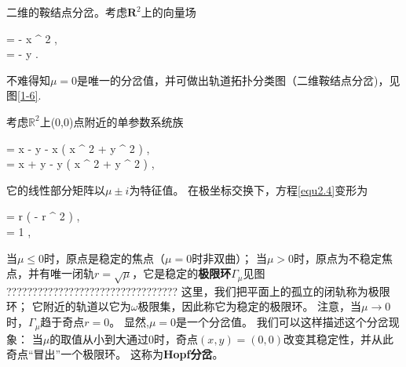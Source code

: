 \begin{example}
  二维的鞍结点分岔。考虑$\mathbf { R } ^ { 2 }$上的向量场
  \begin{ode}
        \dxdt = \mu - x ^ { 2 }  ,\\
        \dydt = - y .
  \end{ode}
  不难得知\(\mu=0\)是唯一的分岔值，并可做出轨道拓扑分类图（二维鞍结点分岔)，见图\ref{1-6}.
\end{example}

\begin{example}
  考虑$\mathbb{ R } ^ { 2 }$上(0,0)点附近的单参数系统族
\begin{ode}
\label{equ2.4}
\dxdt = \mu x - y - x \left( x ^ { 2 } + y ^ { 2 } \right) , \\
\dydt = x + \mu y - y \left( x ^ { 2 } + y ^ { 2 } \right) ,
\end{ode}
它的线性部分矩阵以$\mu \pm i$为特征值。
在极坐标交换下，方程\ref{equ2.4}变形为
\begin{ode}
      \dxdt= r \left( \mu - r ^ { 2 } \right)  ,\\
     \dydt = 1 ,
\end{ode}
当$\mu \leqslant 0$时，原点是稳定的焦点（\(\mu=0\)时非双曲）；
当$\mu > 0$时，原点为不稳定焦点，并有唯一闭轨$r = \sqrt{ \mu }$，它是稳定的\textbf{极限环}\(\Gamma_\mu\)见图
?????????????????????????????????
这里，我们把平面上的孤立的闭轨称为极限环；
它附近的轨道以它为\(\omega\)极限集，因此称它为稳定的极限环。
注意，当$\mu \rightarrow 0$时，\(\Gamma_\mu\)趋于奇点$r = 0$。
显然,\(\mu=0\)是一个分岔值。
我们可以这样描述这个分岔现象：
当\(\mu\)的取值从小到大通过0时，奇点$( x , y ) = ( 0,0 )$改变其稳定性，并从此奇点“冒出”一个极限环。
这称为\textbf{Hopf分岔}。
\end{example}

